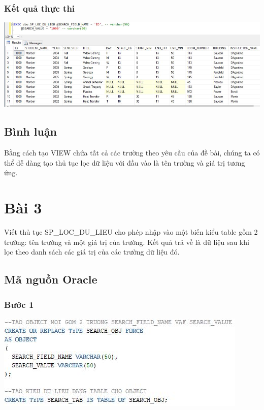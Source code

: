 \documentclass[12pt,a4paper]{report}
\begin{document}
\subsubsection{Kết quả thực thi}
\includegraphics[scale=.58]{kb2s.jpg}\\

\subsection{Bình luận}
Bằng cách tạo VIEW chứa tất cả các trường theo yêu cầu của đề bài, chúng ta có thể dễ dàng tạo thủ tục lọc dữ liệu với đầu vào là tên trường và giá trị tương ứng.
\section{Bài 3}
\begin{boxedminipage}[t]{15.5cm}
Viết thủ tục SP\_LOC\_DU\_LIEU cho phép nhập vào một biến kiểu table gồm 2 trường: tên trường và một giá trị của trường. Kết quả trả về là dữ liệu sau khi lọc theo danh sách các giá trị của các trường dữ liệu đó.	
\end{boxedminipage}

\subsection{Mã nguồn Oracle}
\subsubsection{Bước 1}
\includegraphics[scale=1]{b3o1.jpg}
\end{document}
